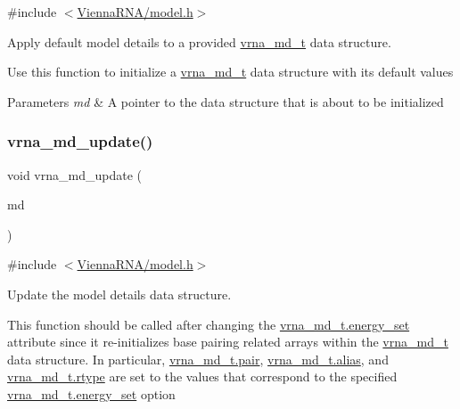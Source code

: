 {\ttfamily \#include $<$\mbox{\hyperlink{model_8h}{Vienna\+R\+N\+A/model.\+h}}$>$}



Apply default model details to a provided \mbox{\hyperlink{group__model__details_ga1f8a10e12a0a1915f2a4eff0b28ea17c}{vrna\+\_\+md\+\_\+t}} data structure. 

Use this function to initialize a \mbox{\hyperlink{group__model__details_ga1f8a10e12a0a1915f2a4eff0b28ea17c}{vrna\+\_\+md\+\_\+t}} data structure with its default values


\begin{DoxyParams}{Parameters}
{\em md} & A pointer to the data structure that is about to be initialized \\
\hline
\end{DoxyParams}
\mbox{\label{group__model__details_ga36ae40b8c3b82362f5798ad5b047b814}} 
\subsubsection{\texorpdfstring{vrna\+\_\+md\+\_\+update()}{vrna\_md\_update()}}
{\footnotesize\ttfamily void vrna\+\_\+md\+\_\+update (\begin{DoxyParamCaption}\item[{\mbox{\hyperlink{group__model__details_ga1f8a10e12a0a1915f2a4eff0b28ea17c}{vrna\+\_\+md\+\_\+t}} $\ast$}]{md }\end{DoxyParamCaption})}



{\ttfamily \#include $<$\mbox{\hyperlink{model_8h}{Vienna\+R\+N\+A/model.\+h}}$>$}



Update the model details data structure. 

This function should be called after changing the \mbox{\hyperlink{group__model__details_a5eee4e3b468eb690d1407e0178dafb3f}{vrna\+\_\+md\+\_\+t.\+energy\+\_\+set}} attribute since it re-\/initializes base pairing related arrays within the \mbox{\hyperlink{group__model__details_ga1f8a10e12a0a1915f2a4eff0b28ea17c}{vrna\+\_\+md\+\_\+t}} data structure. In particular, \mbox{\hyperlink{group__model__details_ab4da594c638707e212f64aadb54a7454}{vrna\+\_\+md\+\_\+t.\+pair}}, \mbox{\hyperlink{group__model__details_a66136cf9abc8ff790ec0d33245d68fd5}{vrna\+\_\+md\+\_\+t.\+alias}}, and \mbox{\hyperlink{group__model__details_ad082d0fea31e002b90cdfe5e6382f8b0}{vrna\+\_\+md\+\_\+t.\+rtype}} are set to the values that correspond to the specified \mbox{\hyperlink{group__model__details_a5eee4e3b468eb690d1407e0178dafb3f}{vrna\+\_\+md\+\_\+t.\+energy\+\_\+set}} option

